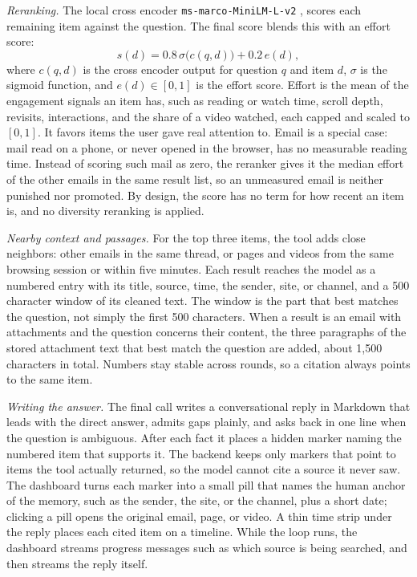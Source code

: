 \documentclass[conference]{IEEEtran}
\newcommand{\rerankmodel}{\texttt{ms\allowbreak-marco\allowbreak-MiniLM\allowbreak-L\allowbreak-6\allowbreak-v2}}
\begin{document}
\textit{Reranking.} The local cross encoder \rerankmodel{} \cite{b10}, \cite{b11} scores each remaining item against the question. The final score blends this with an effort score:
\begin{equation}
s(d) = 0.8\,\sigma\big(c(q,d)\big) + 0.2\,e(d), \label{eq:final}
\end{equation}
where $c(q,d)$ is the cross encoder output for question $q$ and item $d$, $\sigma$ is the sigmoid function, and $e(d) \in [0,1]$ is the effort score. Effort is the mean of the engagement signals an item has, such as reading or watch time, scroll depth, revisits, interactions, and the share of a video watched, each capped and scaled to $[0,1]$. It favors items the user gave real attention to. Email is a special case: mail read on a phone, or never opened in the browser, has no measurable reading time. Instead of scoring such mail as zero, the reranker gives it the median effort of the other emails in the same result list, so an unmeasured email is neither punished nor promoted. By design, the score has no term for how recent an item is, and no diversity reranking is applied.

\textit{Nearby context and passages.} For the top three items, the tool adds close neighbors: other emails in the same thread, or pages and videos from the same browsing session or within five minutes. Each result reaches the model as a numbered entry with its title, source, time, the sender, site, or channel, and a 500 character window of its cleaned text. The window is the part that best matches the question, not simply the first 500 characters. When a result is an email with attachments and the question concerns their content, the three paragraphs of the stored attachment text that best match the question are added, about 1,500 characters in total. Numbers stay stable across rounds, so a citation always points to the same item.

\textit{Writing the answer.} The final call writes a conversational reply in Markdown that leads with the direct answer, admits gaps plainly, and asks back in one line when the question is ambiguous. After each fact it places a hidden marker naming the numbered item that supports it. The backend keeps only markers that point to items the tool actually returned, so the model cannot cite a source it never saw. The dashboard turns each marker into a small pill that names the human anchor of the memory, such as the sender, the site, or the channel, plus a short date; clicking a pill opens the original email, page, or video. A thin time strip under the reply places each cited item on a timeline. While the loop runs, the dashboard streams progress messages such as which source is being searched, and then streams the reply itself.
\end{document}
